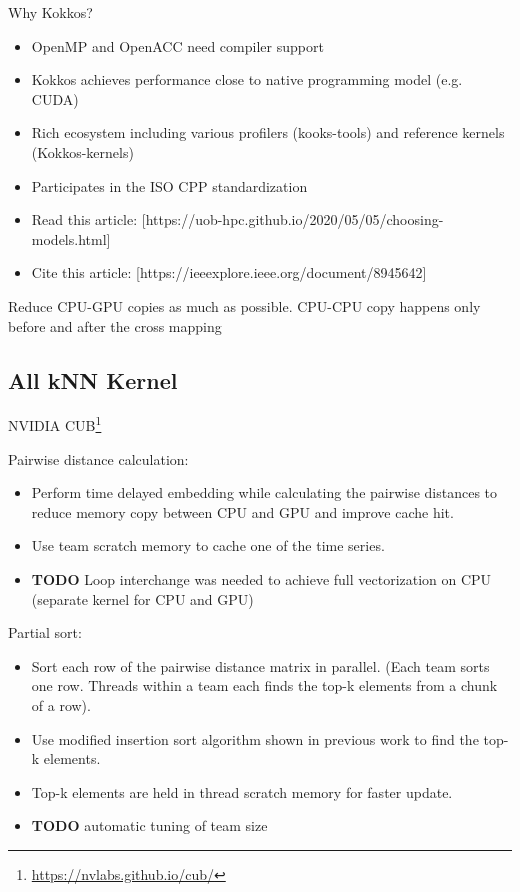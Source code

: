 \documentclass[conference]{IEEEtran}
\begin{document}
Why Kokkos?
\begin{itemize}
    \item OpenMP and OpenACC need compiler support
    \item Kokkos achieves performance close to native programming model (e.g. CUDA)
    \item Rich ecosystem including various profilers (kooks-tools) and reference kernels  (Kokkos-kernels)
    \item Participates in the ISO CPP standardization
    \item Read this article: [https://uob-hpc.github.io/2020/05/05/choosing-models.html]
    \item Cite this article: [https://ieeexplore.ieee.org/document/8945642]
\end{itemize}

Reduce CPU-GPU copies as much as possible. CPU-CPU copy happens only before
and after the cross mapping

\subsection{All kNN Kernel}

NVIDIA CUB\footnote{\url{https://nvlabs.github.io/cub/}}

Pairwise distance calculation:
\begin{itemize}
\item Perform time delayed embedding while calculating the pairwise distances
    to reduce memory copy between CPU and GPU and improve cache hit.
\item Use team scratch memory to cache one of the time series.
\item \textbf{TODO} Loop interchange was needed to achieve full vectorization
    on CPU (separate kernel for CPU and GPU)
\end{itemize}

Partial sort:
\begin{itemize}
\item Sort each row of the pairwise distance matrix in parallel. (Each team sorts one row. Threads within a team each finds the top-k elements from a chunk of a row).
\item Use modified insertion sort algorithm shown in previous work to find the top-k elements.
\item Top-k elements are held in thread scratch memory for faster update.
\item \textbf{TODO} automatic tuning of team size
\end{itemize}
\end{document}
